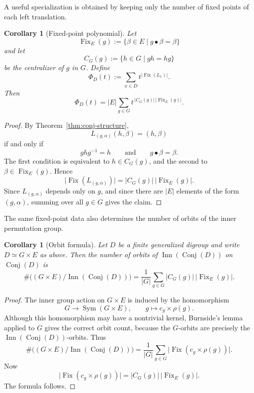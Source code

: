 \documentclass[11pt]{article}
\theoremstyle{plain}
\newtheorem{corollary}[theorem]{Corollary}
\theoremstyle{definition}
\theoremstyle{remark}
\DeclareMathOperator{\Conj}{Conj}
\begin{document}
	A useful specialization is obtained by keeping only the number of fixed points
	of each left translation.
	
	\begin{corollary}[Fixed-point polynomial]\label{cor:fixed-point-polynomial}
		Let
		\[
		\operatorname{Fix}_E(g)
		:=
		\{\beta\in E\mid g\bullet\beta=\beta\}
		\]
		and let
		\[
		C_G(g):=\{h\in G\mid gh=hg\}
		\]
		be the centralizer of \(g\) in \(G\). Define
		\[
		\Phi_D(t)
		:=
		\sum_{x\in D}
		t^{\lvert \operatorname{Fix}(L_x)\rvert }.
		\]
		Then
		\[
		\Phi_D(t)
		=
		\lvert E\rvert 
		\sum_{g\in G}
		t^{\,\lvert C_G(g)\vert \,\lvert \operatorname{Fix}_E(g)\rvert }.
		\]
	\end{corollary}
	
	\begin{proof}
		By Theorem~\ref{thm:conj-structure},
		\[
		L_{(g,\alpha)}(h,\beta)=(h,\beta)
		\]
		if and only if
		\[
		ghg^{-1}=h
		\qquad\text{and}\qquad
		g\bullet\beta=\beta.
		\]
		The first condition is equivalent to \(h\in C_G(g)\), and the second to
		\(\beta\in\operatorname{Fix}_E(g)\). Hence
		\[
		\lvert \operatorname{Fix}(L_{(g,\alpha)})\rvert
		=
		\lvert C_G(g)\rvert \,\lvert \operatorname{Fix}_E(g)\rvert.
		\]
		Since \(L_{(g,\alpha)}\) depends only on \(g\), and since there are \(|E|\)
		elements of the form \((g,\alpha)\), summing over all \(g\in G\) gives the
		claim.
	\end{proof}
	
	The same fixed-point data also determines the number of orbits of the inner
	permutation group.
	
	\begin{corollary}[Orbit formula]\label{cor:orbit-formula}
		Let \(D\) be a finite generalized digroup and write \(D\simeq G\times E\)
		as above. Then the number of orbits of \(\operatorname{Inn}(\Conj(D))\) on
		\(\Conj(D)\) is
		\[
		\#\bigl((G\times E)/\operatorname{Inn}(\Conj(D))\bigr)
		=
		\frac{1}{\lvert G\rvert }
		\sum_{g\in G}
		\lvert C_G(g)\rvert \,\lvert \operatorname{Fix}_E(g)\rvert .
		\]
	\end{corollary}
	
	\begin{proof}
		The inner group action on \(G\times E\) is induced by the homomorphism
		\[
		G\longrightarrow \operatorname{Sym}(G\times E),
		\qquad
		g\longmapsto c_g\times\rho(g).
		\]
		Although this homomorphism may have a nontrivial kernel, Burnside's lemma
		applied to \(G\) gives the correct orbit count, because the \(G\)-orbits are
		precisely the \(\operatorname{Inn}(\Conj(D))\)-orbits. Thus
		\[
		\#\bigl((G\times E)/\operatorname{Inn}(\Conj(D))\bigr)
		=
		\frac{1}{|G|}
		\sum_{g\in G}
		\lvert \operatorname{Fix}(c_g\times\rho(g))\rvert.
		\]
		Now
		\[
		\lvert\operatorname{Fix}(c_g\times\rho(g))\rvert
		=
		\lvert C_G(g)\rvert\,\lvert\operatorname{Fix}_E(g)\rvert.
		\]
		The formula follows.
	\end{proof}
	
\end{document}
